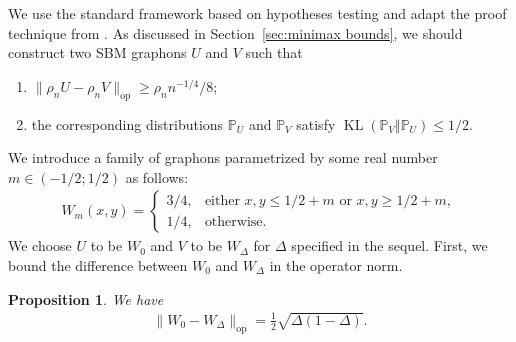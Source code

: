 \documentclass[11pt]{article}
\renewcommand{\P}{\mathbb{P}}
\newcommand{\opnorm}[1]{\|#1\|_{\mathrm{op}}}
\newcommand{\KL}[2]{\operatorname{KL}\left (#1\Vert #2 \right )}
\newcommand{\<}{\langle}
\renewcommand{\>}{\rangle}
\theoremstyle{plain}
\newtheorem{prop}{Proposition}
\theoremstyle{definition}
\theoremstyle{remark}
\begin{document}
{We use the standard framework based on hypotheses testing and adapt the proof technique from \citep{klopp2017}. As discussed in Section~\ref{sec:minimax bounds}, we should construct two SBM graphons $U$ and $V$ such that
\begin{enumerate}
    \item $\opnorm{\rho_n U - \rho_n V} \ge \rho_n n^{-1/4} / 8$;
    \item the corresponding distributions $\P_U$ and $\P_V$ satisfy $\KL{\P_V}{\P_U} \le 1/2$.
\end{enumerate}
We introduce a family of graphons parametrized by some real number $m \in (-1/2; 1/2)$ as follows:
\begin{align*}
    W_{m}(x, y) = \begin{cases}
        3/4, & \text{either $x, y \le 1/2 + m$ or $x, y \ge 1/2 + m$}, \\
        1/4, & \text{otherwise}.
    \end{cases}
\end{align*}
We choose $U$ to be $W_0$ and $V$ to be $W_{\Delta}$ for $\Delta$ specified in the sequel. First, we bound the difference between $W_0$ and $W_{\Delta}$ in the operator norm.
\begin{prop}
    \label{prop:risk lower bound}
    We have
    \begin{align*}
        \opnorm{W_0 - W_{\Delta}} = \frac{1}{2} \sqrt{\Delta (1 - \Delta)}.
    \end{align*}
\end{prop}

}
\end{document}
